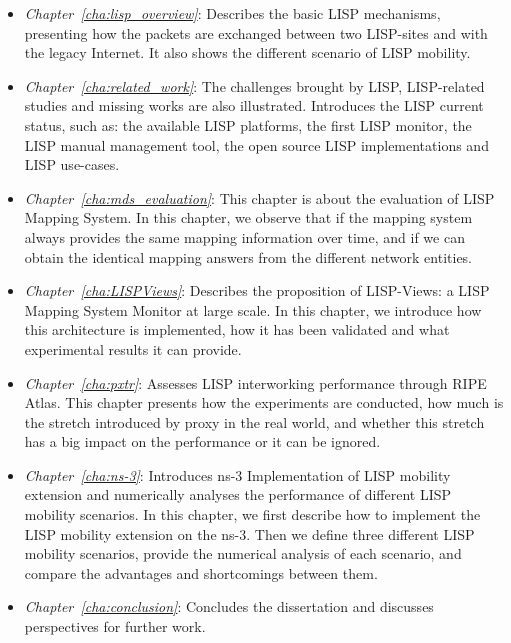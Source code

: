 \begin{itemize}[noitemsep,topsep=0pt]
	\item \emph{Chapter~\ref{cha:lisp_overview}}: Describes the basic LISP mechanisms, presenting how the packets are exchanged between two LISP-sites and with the legacy Internet. It also shows the different scenario of LISP mobility.
	\item \emph{Chapter~\ref{cha:related_work}}: The challenges brought by LISP, LISP-related studies and missing works are also illustrated. Introduces the LISP current status, such as: the available LISP platforms, the first LISP monitor, the LISP manual management tool, the open source LISP implementations and LISP use-cases.
    \item \emph{Chapter~\ref{cha:mds_evaluation}}: This chapter is about the evaluation of LISP Mapping System. In this chapter, we observe that if the mapping system always provides the same mapping information over time, and if we can obtain the identical mapping answers from the different network entities.
    \item \emph{Chapter~\ref{cha:LISPViews}}: Describes the proposition of LISP-Views: a LISP Mapping System Monitor at large scale. In this chapter, we introduce how this architecture is implemented, how it has been validated and what experimental results it can provide.
    \item \emph{Chapter~\ref{cha:pxtr}}: Assesses LISP interworking performance through RIPE Atlas. This chapter presents how the experiments are conducted, how much is the stretch introduced by proxy in the real world, and whether this stretch has a big impact on the performance or it can be ignored.
    \item \emph{Chapter~\ref{cha:ns-3}}: Introduces ns-3 Implementation of LISP mobility extension and numerically analyses the performance of different LISP mobility scenarios. In this chapter, we first describe how to implement the LISP mobility extension on the ns-3. Then we define three different LISP mobility scenarios, provide the numerical analysis of each scenario, and compare the advantages and shortcomings between them. 
    \item \emph{Chapter~\ref{cha:conclusion}}: Concludes the dissertation and discusses perspectives for further work.
\end{itemize}